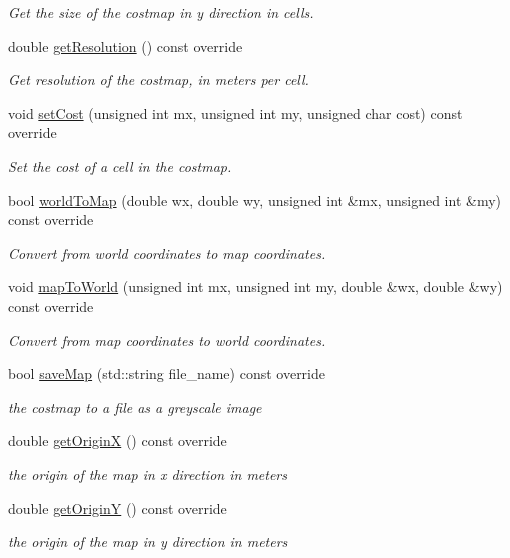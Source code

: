 \begin{DoxyCompactItemize}
\begin{DoxyCompactList}\small\item\em Get the size of the costmap in y direction in cells. \end{DoxyCompactList}\item 
double \hyperlink{classquadtree__planner_1_1CostmapAdapter_abfe3febc6445cbbd2aa7379c8635539b}{get\+Resolution} () const override
\begin{DoxyCompactList}\small\item\em Get resolution of the costmap, in meters per cell. \end{DoxyCompactList}\item 
void \hyperlink{classquadtree__planner_1_1CostmapAdapter_a816f4036c5a67297c72302ad4329b98b}{set\+Cost} (unsigned int mx, unsigned int my, unsigned char cost) const override
\begin{DoxyCompactList}\small\item\em Set the cost of a cell in the costmap. \end{DoxyCompactList}\item 
bool \hyperlink{classquadtree__planner_1_1CostmapAdapter_a422624b4df8d3fa267eb367389b73751}{world\+To\+Map} (double wx, double wy, unsigned int \&mx, unsigned int \&my) const override
\begin{DoxyCompactList}\small\item\em Convert from world coordinates to map coordinates. \end{DoxyCompactList}\item 
void \hyperlink{classquadtree__planner_1_1CostmapAdapter_aa3b530c60bd8565e32166642e5e37663}{map\+To\+World} (unsigned int mx, unsigned int my, double \&wx, double \&wy) const override
\begin{DoxyCompactList}\small\item\em Convert from map coordinates to world coordinates. \end{DoxyCompactList}\item 
bool \hyperlink{classquadtree__planner_1_1CostmapAdapter_a11201eaf5094483113acf5d195923893}{save\+Map} (std\+::string file\+\_\+name) const override
\begin{DoxyCompactList}\small\item\em the costmap to a file as a greyscale image \end{DoxyCompactList}\item 
double \hyperlink{classquadtree__planner_1_1CostmapAdapter_ad63fb92c24234eb69b7672a7c9f15d26}{get\+OriginX} () const override
\begin{DoxyCompactList}\small\item\em the origin of the map in x direction in meters \end{DoxyCompactList}\item 
double \hyperlink{classquadtree__planner_1_1CostmapAdapter_a004ee5ebfac631b47f6d3987e933cd38}{get\+OriginY} () const override
\begin{DoxyCompactList}\small\item\em the origin of the map in y direction in meters \end{DoxyCompactList}\end{DoxyCompactItemize}



